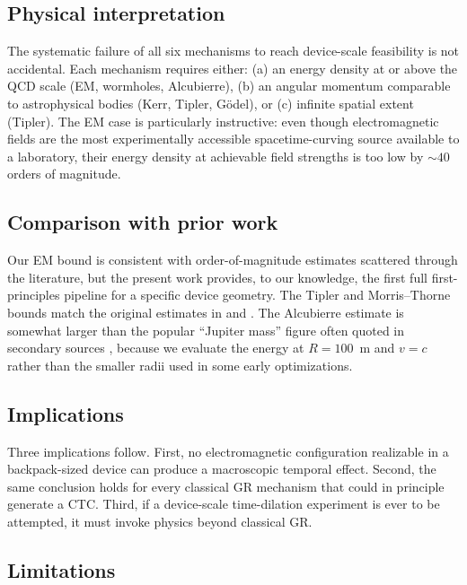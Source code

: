 \documentclass[11pt,a4paper,twocolumn]{article}
\begin{document}
\subsection{Physical interpretation}
\label{subsec:interp}

The systematic failure of all six mechanisms to reach device-scale
feasibility is not accidental. Each mechanism requires either:
(a) an energy density at or above the QCD scale (EM, wormholes,
Alcubierre), (b) an angular momentum comparable to astrophysical
bodies (Kerr, Tipler, G\"odel), or (c) infinite spatial extent
(Tipler). The EM case is particularly instructive: even though
electromagnetic fields are the most experimentally accessible
spacetime-curving source available to a laboratory, their energy
density at achievable field strengths is too low by $\sim 40$
orders of magnitude.

\subsection{Comparison with prior work}
\label{subsec:prior}

Our EM bound is consistent with order-of-magnitude estimates
scattered through the literature, but the present work provides,
to our knowledge, the first full first-principles pipeline for
a specific device geometry. The Tipler and Morris--Thorne bounds
match the original estimates in \citet{Tipler1974} and
\citet{MorrisThorne1988}. The Alcubierre estimate is somewhat
larger than the popular ``Jupiter mass'' figure often quoted in
secondary sources \citep{Alcubierre1994}, because we evaluate the
energy at $R=100$~m and $v=c$ rather than the smaller radii used
in some early optimizations.

\subsection{Implications}
\label{subsec:impl}

Three implications follow. First, no electromagnetic configuration
realizable in a backpack-sized device can produce a macroscopic
temporal effect. Second, the same conclusion holds for every
classical GR mechanism that could in principle generate a CTC.
Third, if a device-scale time-dilation experiment is ever to be
attempted, it must invoke physics beyond classical GR.

\subsection{Limitations}
\label{subsec:limits}
\end{document}
